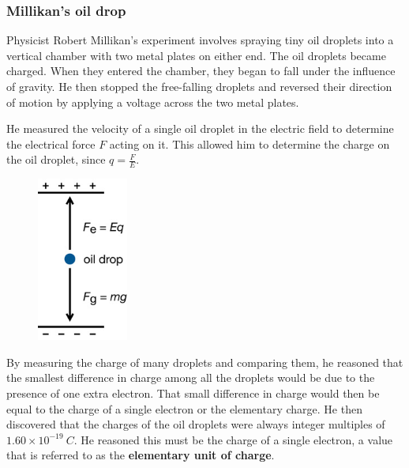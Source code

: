 \subsubsection{Millikan's oil drop}
Physicist Robert Millikan's experiment involves spraying tiny oil droplets into a vertical chamber with two metal plates on either end. The oil droplets became charged. When they entered the chamber, they began to fall under the influence of gravity. He then stopped the free-falling droplets and reversed their direction of motion by applying a voltage across the two metal plates. 

He measured the velocity of a single oil droplet in the electric field to determine the electrical force $F$ acting on it. This allowed him to determine the charge on the oil droplet, since $q=\frac{F}{E}$.

\begin{figure}[H]
    \centering
    \includegraphics[width=3cm]{images/oil-droplet_free_body_diagram.jpg}
\end{figure}

By measuring the charge of many droplets and comparing them, he reasoned that the smallest difference in charge among all the droplets would be due to the presence of one extra electron. That small difference in charge would then be equal to the charge of a single electron or the elementary charge. He then discovered that the charges of the oil droplets were always integer multiples of $1.60 \times 10^{-19}\:\unit{C}$. He reasoned this must be the charge of a single electron, a value that is referred to as the \textbf{elementary unit of charge}.

\pagebreak

